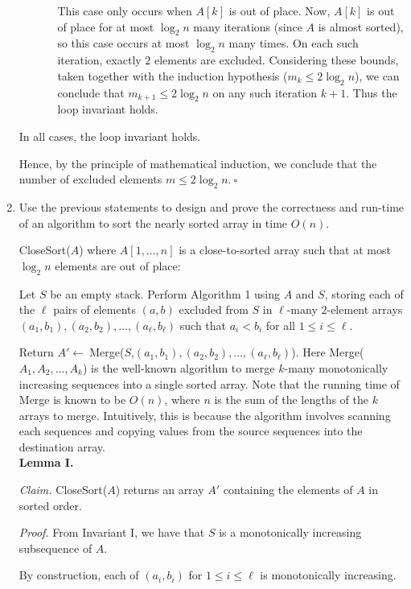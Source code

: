 \begin{enumerate}
\begin{solution}
\begin{itemize}
\begin{itemize}
This case only occurs when $A[k]$ is out of place. Now, $A[k]$ is out of place for at most $\log_2n$ many iterations (since $A$ is almost sorted), so this case occurs at most $\log_2n$ many times. On each such iteration, exactly $2$ elements are excluded. Considering these bounds, taken together with the induction hypothesis ($m_k\leq 2\log_2n$), we can conclude that $m_{k+1}\leq 2\log_2n$ on any such iteration $k+1$. Thus the loop invariant holds.
\end{itemize}
\end{itemize}
In all cases, the loop invariant holds.

Hence, by the principle of mathematical induction, we conclude that the number of excluded elements $m\leq 2\log_2n$.$~\square$
\end{solution}
\newpage\item Use the previous statements to design and prove the correctness and run-time of an algorithm to sort the nearly sorted array in time $O(n)$.
\begin{solution}{\sc CloseSort}($A$) where $A[1,\dots,n]$ is a close-to-sorted array such that at most $\log_2n$ elements are out of place:

Let $S$ be an empty stack. Perform Algorithm 1 using $A$ and $S$, storing each of the $\ell$ pairs of elements $(a,b)$ excluded from $S$ in $\ell$-many $2$-element arrays $(a_1,b_1),(a_2,b_2),\dots,(a_\ell,b_\ell)$ such that $a_i<b_i$ for all $1\leq i\leq\ell$. 

Return $A'\leftarrow~${\sc Merge}($S$,$(a_1,b_1),(a_2,b_2),\dots,(a_\ell,b_\ell)$). Here {\sc Merge}($A_1,A_2,\dots,A_k$) is the well-known algorithm to merge $k$-many monotonically increasing sequences into a single sorted array. Note that the running time of {\sc Merge} is known to be $O(n)$, where $n$ is the sum of the lengths of the $k$ arrays to merge. Intuitively, this is because the algorithm involves scanning each sequences and copying values from the source sequences into the destination array.\\

\textbf{Lemma I.}

\textit{Claim. }{\sc CloseSort}($A$) returns an array $A'$ containing the elements of $A$ in sorted order.

\textit{Proof. }
From Invariant I, we have that $S$ is a monotonically increasing subsequence of $A$.

By construction, each of $(a_i,b_i)$ for $1\leq i\leq\ell$ is monotonically increasing.


\end{solution}
\end{enumerate}
